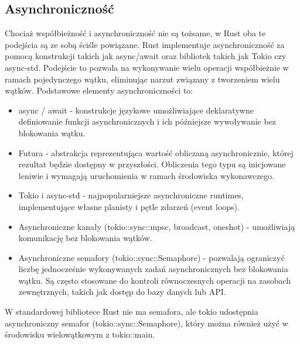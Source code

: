 \subsection{Asynchroniczność}
Chociaż współbieżność i asynchroniczność nie są tożsame, w Rust oba te podejścia są ze sobą ściśle powiązane. Rust implementuje asynchroniczność za pomocą konstrukcji takich jak async/await oraz bibliotek takich jak Tokio czy async-std. Podejście to pozwala na wykonywanie wielu operacji współbieżnie w ramach pojedynczego wątku, eliminując narzut związany z tworzeniem wielu wątków.
Podstawowe elementy asynchroniczności to:
\begin{itemize}
    \item async / await - konstrukcje językowe umożliwiające deklaratywne definiowanie funkcji asynchronicznych i ich późniejsze wywoływanie bez blokowania wątku.
    \item Futura - abstrakcja reprezentująca wartość obliczaną asynchronicznie, której rezultat będzie dostępny w przyszłości. Obliczenia tego typu są inicjowane leniwie i wymagają uruchomienia w ramach środowiska wykonawczego.
    \item Tokio i async-std - najpopularniejsze asynchroniczne runtimes, implementujące własne planisty i pętle zdarzeń (event loops).
    \item Asynchroniczne kanały (tokio::sync::mpsc, broadcast, oneshot) - umożliwiają komunikację bez blokowania wątków.
    \item Asynchroniczne semafory (tokio::sync::Semaphore) - pozwalają ograniczyć liczbę jednocześnie wykonywanych zadań asynchronicznych bez blokowania wątku. Są często stosowane do kontroli równoczesnych operacji na zasobach zewnętrznych, takich jak dostęp do bazy danych lub API.
\end{itemize}
W standardowej bibliotece Rust nie ma semafora, ale tokio udostępnia asynchroniczny semafor (tokio::sync::Semaphore), który można również użyć w środowisku wielowątkowym z tokio::main.

